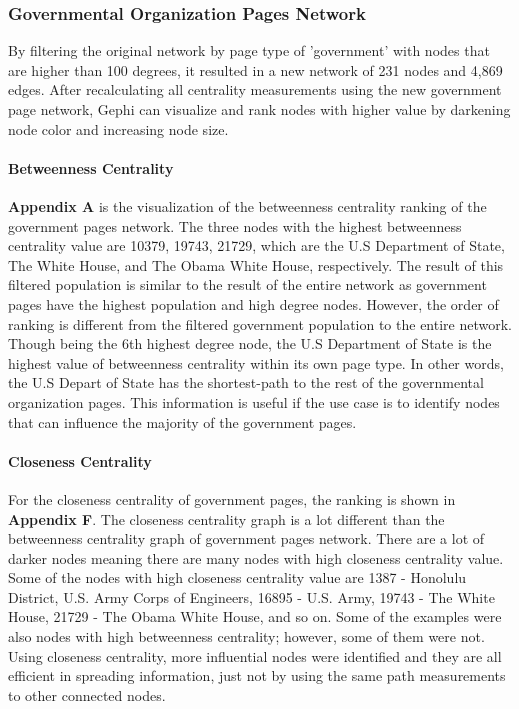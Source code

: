 \documentclass[11pt,twocolumn]{article}
\begin{document}
\subsubsection{Governmental Organization Pages Network}
By filtering the original network by page type of 'government' with nodes that are higher than 100 degrees, it resulted in a new network of 231 nodes and 4,869 edges. After recalculating all centrality measurements using the new government page network, Gephi can visualize and rank nodes with higher value by darkening node color and increasing node size. 

\paragraph{Betweenness Centrality}
\textbf{Appendix A} is the visualization of the betweenness centrality ranking of the government pages network. The three nodes with the highest betweenness centrality value are 10379, 19743, 21729, which are the U.S Department of State, The White House, and The Obama White House, respectively. The result of this filtered population is similar to the result of the entire network as government pages have the highest population and high degree nodes. However, the order of ranking is different from the filtered government population to the entire network. Though being the 6th highest degree node, the U.S Department of State is the highest value of betweenness centrality within its own page type. In other words, the U.S Depart of State has the shortest-path to the rest of the governmental organization pages. This information is useful if the use case is to identify nodes that can influence the majority of the government pages. 

\paragraph{Closeness Centrality}
For the closeness centrality of government pages, the ranking is shown in \textbf{Appendix F}. The closeness centrality graph is a lot different than the betweenness centrality graph of government pages network. There are a lot of darker nodes meaning there are many nodes with high closeness centrality value. Some of the nodes with high closeness centrality value are 1387 - Honolulu District, U.S. Army Corps of Engineers, 16895 - U.S. Army, 19743 - The White House, 21729 - The Obama White House, and so on. Some of the examples were also nodes with high betweenness centrality; however, some of them were not. Using closeness centrality, more influential nodes were identified and they are all efficient in spreading information, just not by using the same path measurements to other connected nodes.
\end{document}
